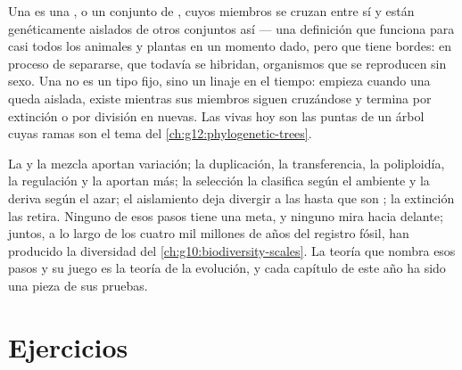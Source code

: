 \begin{proposition}\label{prop:g12:selection-drift-speciation:concept}
Una  es una , o un conjunto de , cuyos
miembros se cruzan entre sí y están genéticamente aislados de otros
conjuntos así --- una definición que funciona para casi todos los
animales y plantas en un momento dado, pero que tiene bordes:
 en proceso de separarse,  que todavía se
hibridan, organismos que se reproducen sin sexo. Una  no es un
tipo fijo, sino un linaje en el tiempo: empieza cuando una 
queda aislada, existe mientras sus miembros siguen cruzándose y termina
por extinción o por división en  nuevas. Las  vivas hoy
son las puntas de un árbol cuyas ramas son el tema del
\cref{ch:g12:phylogenetic-trees}.
\end{proposition}
\admitted

\begin{remark}\label{rem:g12:selection-drift-speciation:assembled}
La  y la mezcla aportan variación; la duplicación, la
transferencia, la poliploidía, la regulación y la  aportan
más; la selección la clasifica según el ambiente y la deriva según el
azar; el aislamiento deja divergir a las  hasta que son
; la extinción las retira. Ninguno de esos pasos tiene una
meta, y ninguno mira hacia delante; juntos, a lo largo de los cuatro
mil millones de años del registro fósil, han producido la diversidad
del \cref{ch:g10:biodiversity-scales}. La teoría que nombra esos pasos
y su juego es la teoría de la evolución, y cada capítulo de este año ha
sido una pieza de sus pruebas.
\end{remark}

\section{Ejercicios}

